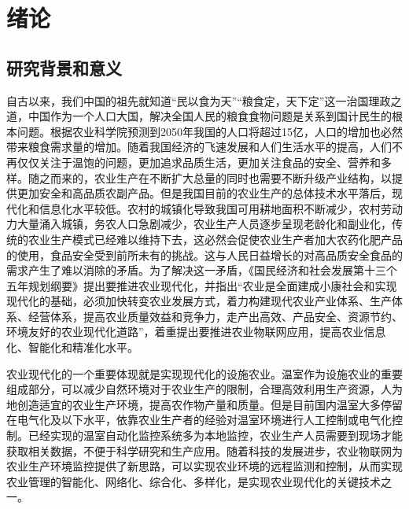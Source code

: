

\chapter{绪论}
\label{chapter:Introduction}

\section{研究背景和意义}
自古以来，我们中国的祖先就知道“民以食为天”“粮食定，天下定”这一治国理政之道\supercite{ChenYunWenXuan}，中国作为一个人口大国，解决全国人民的粮食食物问题是关系到国计民生的根本问题。根据农业科学院预测到2050年我国的人口将超过15亿，人口的增加也必然带来粮食需求量的增加。随着我国经济的飞速发展和人们生活水平的提高，人们不再仅仅关注于温饱的问题，更加追求品质生活，更加关注食品的安全、营养和多样\supercite{FengZhiming2007,ZhaoQiguo2011}。随之而来的，农业生产在不断扩大总量的同时也需要不断升级产业结构，以提供更加安全和高品质农副产品。但是我国目前的农业生产的总体技术水平落后，现代化和信息化水平较低。农村的城镇化导致我国可用耕地面积不断减少，农村劳动力大量涌入城镇\supercite{YuJunli2001}，务农人口急剧减少，农业生产人员逐步呈现老龄化和副业化\supercite{LuoChaobin2005}，传统的农业生产模式已经难以维持下去，这必然会促使农业生产者加大农药化肥产品的使用，食品安全受到前所未有的挑战。这与人民日益增长的对高品质安全食品的需求产生了难以消除的矛盾。为了解决这一矛盾，《国民经济和社会发展第十三个五年规划纲要》提出要推进农业现代化，并指出“农业是全面建成小康社会和实现现代化的基础，必须加快转变农业发展方式，着力构建现代农业产业体系、生产体系、经营体系，提高农业质量效益和竞争力，走产出高效、产品安全、资源节约、环境友好的农业现代化道路”，着重提出要推进农业物联网应用，提高农业信息化、智能化和精准化水平。

农业现代化的一个重要体现就是实现现代化的设施农业\supercite{LiuLei2013}。温室作为设施农业的重要组成部分，可以减少自然环境对于农业生产的限制，合理高效利用生产资源，人为地创造适宜的农业生产环境，提高农作物产量和质量。但是目前国内温室大多停留在电气化及以下水平，依靠农业生产者的经验对温室环境进行人工控制或电气化控制。已经实现的温室自动化监控系统多为本地监控，农业生产人员需要到现场才能获取相关数据，不便于科学研究和生产应用\supercite{duodiandapeng}。随着科技的发展进步，农业物联网为农业生产环境监控提供了新思路，可以实现农业环境的远程监测和控制，从而实现农业管理的智能化、网络化、综合化、多样化，是实现农业现代化的关键技术之一\supercite{JiYuWuLianWang,WuLianWang,ZhongGuoSheShiNongYe}。

